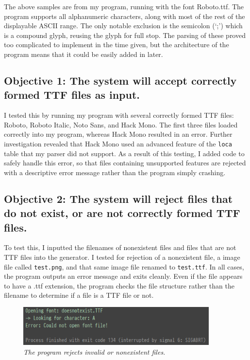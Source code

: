 \documentclass{report}
\begin{document}
The above samples are from my program, running with the font Roboto.ttf. The
program supports all alphanumeric characters, along with most of the rest of the
displayable ASCII range. The only notable exclusion is the semicolon (`;') which
is a compound glyph, reusing the glyph for full stop. The parsing of these
proved too complicated to implement in the time given, but the architecture of the program
means that it could be easily added in later.

\subsection{Objective 1: The system will accept correctly formed TTF files as
  input.}
I tested this by running my program with several correctly formed TTF files:
Roboto, Roboto Italic, Noto Sans, and Hack Mono. The first three files loaded
correctly into my program, whereas Hack Mono resulted in an error. Further
investigation revealed that Hack Mono used an advanced feature of the
\texttt{loca} table that my parser did not support. As a result of this testing,
I added code to safely handle this error, so that files containing unsupported
features are rejected with a descriptive error message rather than the program simply crashing.

\subsection{Objective 2: The system will reject files that do not exist, or are
  not correctly formed TTF files.}

To test this, I inputted the filenames of nonexistent files and files that are
not TTF files into the generator. I tested for rejection of a nonexistent file,
a image file called \texttt{test.png}, and that same image file renamed to
\texttt{test.ttf}. In all cases, the program outputs an error message and exits
cleanly. Even if the file appears to have a .ttf extension, the program checks
the file structure rather than the filename to determine if a file is a TTF file
or not.

\begin{figure}[h]
  \centering
  \includegraphics[width=0.9\textwidth]{notfound}
  \caption{\textit{The program rejects invalid or nonexistent files.}}
\end{figure}
\end{document}
